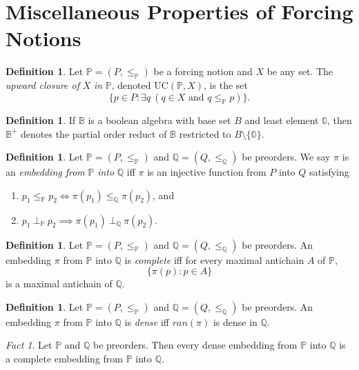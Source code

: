 \documentclass[12pt, twoside]{memoir}
\numberwithin{equation}{section}
\theoremstyle{definition}
\newtheorem{defi}[thm]{Definition}
\theoremstyle{remark}
\newtheorem{fact}[thm]{Fact}
\theoremstyle{definition}
\theoremstyle{definition}
\theoremstyle{definition}
\theoremstyle{remark}
\begin{document}
\section{Miscellaneous Properties of Forcing Notions}

\begin{defi}
Let $\mathbb{P} = (P, \leq_{\mathbb{P}})$ be a forcing notion and $X$ be any set. The \emph{upward closure of} $X$ \emph{in} $\mathbb{P}$, denoted $\mathrm{UC}(\mathbb{P}, X)$, is the set $$\{p \in P : \exists q \ (q \in X \text{ and } q \leq_{\mathbb{P}} p)\}.$$
\end{defi}

\begin{defi}
If $\mathbb{B}$ is a boolean algebra with base set $B$ and least element $\mathbb{0}$, then $\mathbb{B}^+$ denotes the partial order reduct of $\mathbb{B}$ restricted to $B \setminus \{\mathbb{0}\}$.
\end{defi}

\begin{defi}
Let $\mathbb{P} = (P, \leq_{\mathbb{P}})$ and $\mathbb{Q} = (Q, \leq_{\mathbb{Q}})$ be preorders. We say $\pi$ is an \emph{embedding from} $\mathbb{P}$ \emph{into} $\mathbb{Q}$ iff $\pi$ is an injective function from $P$ into $Q$ satisfying
\begin{enumerate}[label=(\alph*)]
    \item $p_1 \leq_{\mathbb{P}} p_2 \iff \pi(p_1) \leq_{\mathbb{Q}} \pi(p_2)$, and
    \item $p_1 \ \bot_{\mathbb{P}} \ p_2 \implies \pi(p_1) \ \bot_{\mathbb{Q}} \ \pi(p_2)$.
\end{enumerate}
\end{defi}

\begin{defi}
Let $\mathbb{P} = (P, \leq_{\mathbb{P}})$ and $\mathbb{Q} = (Q, \leq_{\mathbb{Q}})$ be preorders. An embedding $\pi$ from $\mathbb{P}$ into $\mathbb{Q}$ is \emph{complete} iff for every maximal antichain $A$ of $\mathbb{P}$, $$\{\pi(p) : p \in A\}$$ is a maximal antichain of $\mathbb{Q}$.
\end{defi}

\begin{defi}
Let $\mathbb{P} = (P, \leq_{\mathbb{P}})$ and $\mathbb{Q} = (Q, \leq_{\mathbb{Q}})$ be preorders. An embedding $\pi$ from $\mathbb{P}$ into $\mathbb{Q}$ is \emph{dense} iff $ran(\pi)$ is dense in $\mathbb{Q}$.
\end{defi}

\begin{fact}\label{dic}
Let $\mathbb{P}$ and $\mathbb{Q}$ be preorders. Then every dense embedding from $\mathbb{P}$ into $\mathbb{Q}$ is a complete embedding from $\mathbb{P}$ into $\mathbb{Q}$.
\end{fact}
\end{document}
